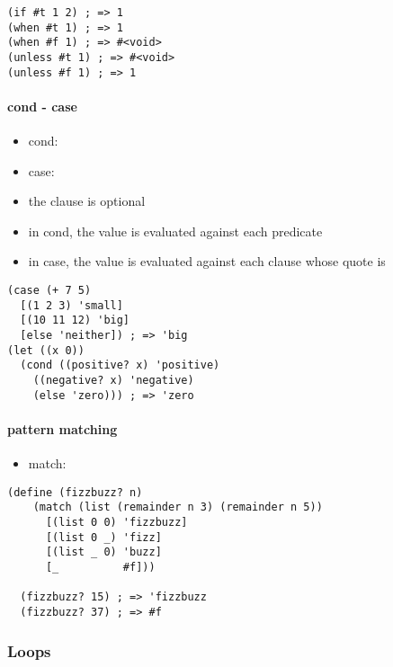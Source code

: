 \documentclass[a4paper,landscape,10pt]{article}
\begin{document}
\begin{multicols*}{2}
  \begin{lstlisting}[language=Racket]
(if #t 1 2) ; => 1
(when #t 1) ; => 1
(when #f 1) ; => #<void>
(unless #t 1) ; => #<void>
(unless #f 1) ; => 1
  \end{lstlisting}

  \paragraph{cond - case}

  \begin{itemize}
    \item cond: 
    \item case: 
    \item the  clause is optional
    \item in cond, the value is evaluated against each predicate
    \item in case, the value is evaluated against each clause whose quote is 
  \end{itemize}

  \begin{lstlisting}[language=Racket]
(case (+ 7 5)
  [(1 2 3) 'small]
  [(10 11 12) 'big]
  [else 'neither]) ; => 'big
(let ((x 0))
  (cond ((positive? x) 'positive)
    ((negative? x) 'negative)
    (else 'zero))) ; => 'zero
  \end{lstlisting}

  \paragraph{pattern matching}

  \begin{itemize}
    \item match: 
  \end{itemize}

  \begin{lstlisting}[language=Racket]
    (define (fizzbuzz? n)
    (match (list (remainder n 3) (remainder n 5))
      [(list 0 0) 'fizzbuzz]
      [(list 0 _) 'fizz]
      [(list _ 0) 'buzz]
      [_          #f]))

  (fizzbuzz? 15) ; => 'fizzbuzz
  (fizzbuzz? 37) ; => #f
  \end{lstlisting}

  \subsubsection{Loops}


\end{multicols*}
\end{document}

